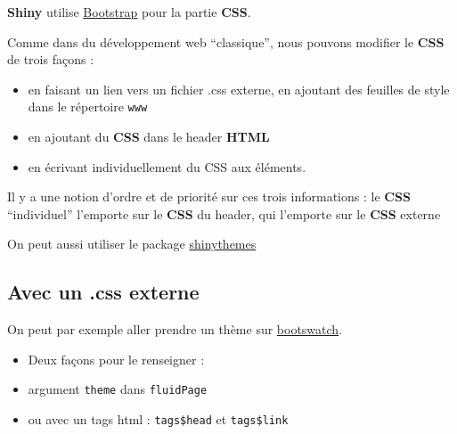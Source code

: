 \documentclass[]{article}
\newenvironment{Shaded}{\begin{snugshade}}{\end{snugshade}}
\newcommand{\KeywordTok}[1]{\textcolor[rgb]{0.13,0.29,0.53}{\textbf{#1}}}
\newcommand{\DataTypeTok}[1]{\textcolor[rgb]{0.13,0.29,0.53}{#1}}
\newcommand{\StringTok}[1]{\textcolor[rgb]{0.31,0.60,0.02}{#1}}
\newcommand{\CommentTok}[1]{\textcolor[rgb]{0.56,0.35,0.01}{\textit{#1}}}
\newcommand{\OperatorTok}[1]{\textcolor[rgb]{0.81,0.36,0.00}{\textbf{#1}}}
\newcommand{\NormalTok}[1]{#1}
\providecommand{\tightlist}{%
  \setlength{\itemsep}{0pt}\setlength{\parskip}{0pt}}
\begin{document}
\textbf{Shiny} utilise \href{http://getbootstrap.com/}{Bootstrap} pour
la partie \textbf{CSS}.

Comme dans du développement web ``classique'', nous pouvons modifier le
\textbf{CSS} de trois façons :

\begin{itemize}
\tightlist
\item
  en faisant un lien vers un fichier .css externe, en ajoutant des
  feuilles de style dans le répertoire \texttt{www}
\item
  en ajoutant du \textbf{CSS} dans le header \textbf{HTML}
\item
  en écrivant individuellement du CSS aux éléments.
\end{itemize}

Il y a une notion d'ordre et de priorité sur ces trois informations : le
\textbf{CSS} ``individuel'' l'emporte sur le \textbf{CSS} du header, qui
l'emporte sur le \textbf{CSS} externe

On peut aussi utiliser le package
\href{http://rstudio.github.io/shinythemes}{shinythemes}

\subsection{Avec un .css externe}\label{avec-un-.css-externe}

On peut par exemple aller prendre un thème sur
\href{http://bootswatch.com/}{bootswatch}.

\begin{itemize}
\tightlist
\item
  Deux façons pour le renseigner :
\item
  argument \texttt{theme} dans \texttt{fluidPage}
\item
  ou avec un tags html : \texttt{tags\$head} et \texttt{tags\$link}
\end{itemize}

\begin{Shaded}
\end{Shaded}
\end{document}
